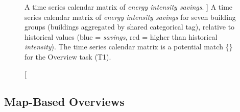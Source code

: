 \begin{figure}
	\centering
	\caption
	[
	    A time series calendar matrix of \textsl{energy intensity savings}.
	]
	{
	    A time series calendar matrix of \textsl{energy intensity savings} for seven building groups (buildings aggregated by shared categorical tag), relative to historical values (blue = \textsl{savings}, red = higher than historical \textsl{intensity}). The time series calendar matrix is a potential match \{\posmatch\} for the Overview task (T1).
	}
	\centering
	\label{emu:fig:sandbox-calendar}
\end{figure}



\subsection{Map-Based Overviews}
\label{emu:design-map}

